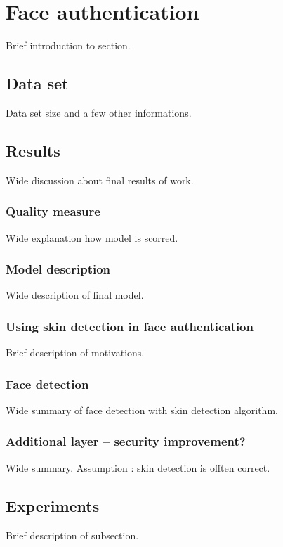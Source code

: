 \section{Face authentication}
    Brief introduction to section.

    \subsection{Data set}
        Data set size and a few other informations.

    \subsection{Results}
        Wide discussion about final results of work.

        \subsubsection*{Quality measure}   %
            Wide explanation how model is scorred.

        \subsubsection*{Model description} %
            Wide description of final model.

        \subsubsection*{Using skin detection in face authentication}
            Brief description of motivations.

            \subsubsection*{Face detection}
                Wide summary of face detection with
                skin detection algorithm.

            \subsubsection*{Additional layer -- security improvement?}
                Wide summary.
                Assumption : skin detection is offten correct.

    \subsection{Experiments}
        Brief description of subsection.
